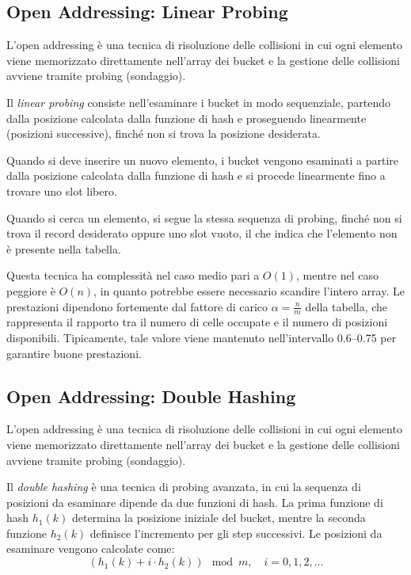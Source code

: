 \subsection{Open Addressing: Linear Probing}

L’open addressing è una tecnica di risoluzione delle collisioni in cui ogni elemento viene memorizzato direttamente nell’array dei bucket 
e la gestione delle collisioni avviene tramite probing (sondaggio).

Il \textit{linear probing} consiste nell’esaminare i bucket in modo sequenziale, partendo dalla posizione calcolata dalla funzione di hash e 
proseguendo linearmente (posizioni successive), finché non si trova la posizione desiderata.

Quando si deve inserire un nuovo elemento, i bucket vengono esaminati a partire dalla posizione calcolata dalla funzione di hash e si procede linearmente fino a trovare uno slot libero.

Quando si cerca un elemento, si segue la stessa sequenza di probing, finché non si trova il record desiderato oppure uno slot vuoto, 
il che indica che l’elemento non è presente nella tabella.

Questa tecnica ha complessità nel caso medio pari a $O(1)$, mentre nel caso peggiore è $O(n)$, in quanto potrebbe essere necessario scandire 
l’intero array. Le prestazioni dipendono fortemente dal fattore di carico $\alpha = \frac{n}{m}$ della tabella, che rappresenta il rapporto 
tra il numero di celle occupate e il numero di posizioni disponibili. Tipicamente, tale valore viene mantenuto nell’intervallo 0.6–0.75 
per garantire buone prestazioni.

\subsection{Open Addressing: Double Hashing}

L’open addressing è una tecnica di risoluzione delle collisioni in cui ogni elemento viene memorizzato direttamente nell’array dei bucket 
e la gestione delle collisioni avviene tramite probing (sondaggio).

Il \textit{double hashing} è una tecnica di probing avanzata, in cui la sequenza di posizioni da esaminare dipende da due funzioni di hash. 
La prima funzione di hash $h_1(k)$ determina la posizione iniziale del bucket, mentre la seconda funzione $h_2(k)$ definisce l’incremento 
per gli step successivi. Le posizioni da esaminare vengono calcolate come:
\[
(h_1(k) + i \cdot h_2(k)) \mod m, \quad i = 0, 1, 2, \dots
\]

